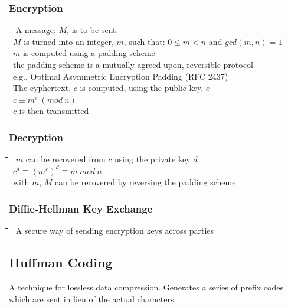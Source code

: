 \documentclass[10pt,letterpaper]{scrartcl}
\newcommand{\tbul}{\textbullet}
\newcommand{\tend}{\>\textendash}
\newcommand{\tasc}{\>\>\textasteriskcentered}
\newcommand{\tabDef}{\hspace{2em}\=\hspace{2em}\=\hspace{2em}\=\hspace{2em}\=\kill}
\begin{document}
\subsubsection{Encryption}
\begin{tabbing}\tabDef 
\tbul\ A message, $M$, is to be sent. \\
\tbul\ $M$ is turned into an integer, $m$, such that: $0 \leq m < n$ and $gcd(m, n) = 1$ \\
	\tend\ $m$ is computed using a padding scheme \\
    	\tasc\ the padding scheme is a mutually agreed upon, reversible protocol\\
        \tasc\ e.g., Optimal Asymmetric Encryption Padding (RFC 2437)\\
\tbul\ The cyphertext, $c$ is computed, using the public key, $e$ \\
	\tend\ $\displaystyle c \equiv m^e \ (mod \ n)$ \\
\tbul\ $c$ is then transmitted
\end{tabbing}
\subsubsection{Decryption}
\begin{tabbing}\tabDef 
\tbul\ $m$ can be recovered from $c$ using the private key $d$ \\
	\tend\ $\displaystyle c^d\equiv (m^e)^d\equiv m \ mod \ n$ \\
\tbul\ with $m$, $M$ can be recovered by reversing the padding scheme
\end{tabbing}
\subsubsection{Diffie-Hellman Key Exchange}
\begin{tabbing}\tabDef 
\tbul\ A secure way of sending encryption keys across parties
\end{tabbing}

\subsection{Huffman Coding}
A technique for lossless data compression. Generates a series of prefix codes which are sent in lieu of the actual characters. 
\end{document}
